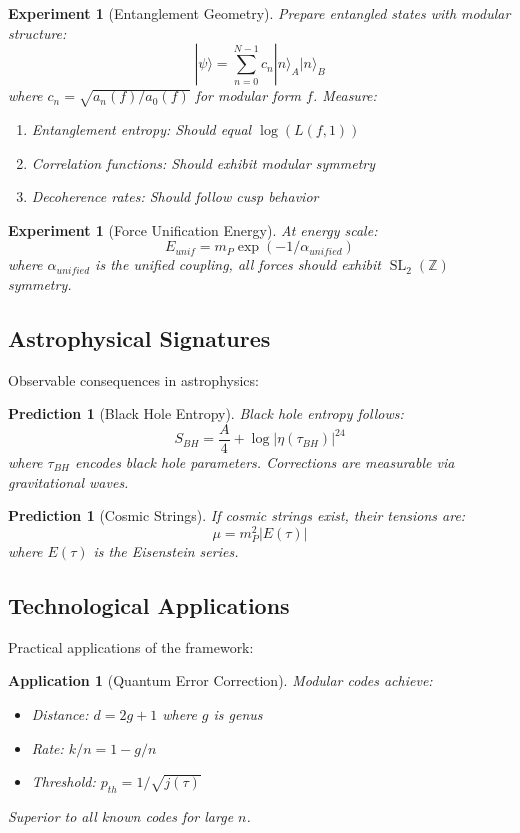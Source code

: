 \documentclass[12pt,a4paper]{article}
\newtheorem{prediction}[theorem]{Prediction}
\newtheorem{experiment}[theorem]{Experiment}
\newtheorem{application}[theorem]{Application}
\DeclareMathOperator{\SL}{SL}
\begin{document}
\begin{experiment}[Entanglement Geometry]
Prepare entangled states with modular structure:
\[
|\psi\rangle = \sum_{n=0}^{N-1} c_n |n\rangle_A |n\rangle_B
\]
where $c_n = \sqrt{a_n(f)/a_0(f)}$ for modular form $f$. Measure:
\begin{enumerate}
\item Entanglement entropy: Should equal $\log(L(f,1))$
\item Correlation functions: Should exhibit modular symmetry
\item Decoherence rates: Should follow cusp behavior
\end{enumerate}
\end{experiment}

\begin{experiment}[Force Unification Energy]
At energy scale:
\[
E_{unif} = m_P \exp(-1/\alpha_{unified})
\]
where $\alpha_{unified}$ is the unified coupling, all forces should exhibit $\SL_2(\mathbb{Z})$ symmetry.
\end{experiment}

\subsection{Astrophysical Signatures}

Observable consequences in astrophysics:

\begin{prediction}[Black Hole Entropy]
Black hole entropy follows:
\[
S_{BH} = \frac{A}{4} + \log|\eta(\tau_{BH})|^{24}
\]
where $\tau_{BH}$ encodes black hole parameters. Corrections are measurable via gravitational waves.
\end{prediction}

\begin{prediction}[Cosmic Strings]
If cosmic strings exist, their tensions are:
\[
\mu = m_P^2 |E(\tau)|
\]
where $E(\tau)$ is the Eisenstein series.
\end{prediction}

\subsection{Technological Applications}

Practical applications of the framework:

\begin{application}[Quantum Error Correction]
Modular codes achieve:
\begin{itemize}
\item Distance: $d = 2g + 1$ where $g$ is genus
\item Rate: $k/n = 1 - g/n$
\item Threshold: $p_{th} = 1/\sqrt{j(\tau)}$
\end{itemize}
Superior to all known codes for large $n$.
\end{application}
\end{document}
